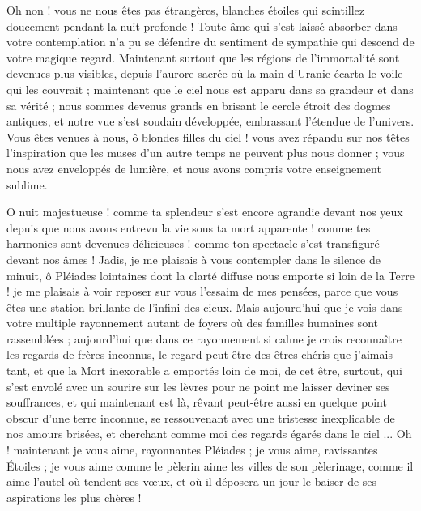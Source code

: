 \documentclass[a4paper, 11pt, oneside, landscape]{article}
\begin{document}
Oh non ! vous ne nous êtes pas étrangères, blanches étoiles qui scintillez doucement pendant la nuit profonde ! Toute âme qui s'est laissé absorber dans votre contemplation n'a pu se défendre du sentiment de sympathie qui descend de votre magique regard. Maintenant surtout que les régions de l'immortalité sont devenues plus visibles, depuis l'aurore sacrée où la main d'Uranie écarta le voile qui les couvrait ; maintenant que le ciel nous est apparu dans sa grandeur et dans sa vérité ; nous sommes devenus grands en brisant le cercle étroit des dogmes antiques, et notre vue s'est soudain développée, embrassant l'étendue de l'univers. Vous êtes venues à nous, ô blondes filles du ciel ! vous avez répandu sur nos têtes l'inspiration que les muses d'un autre temps ne peuvent plus nous donner ; vous nous avez enveloppés de lumière, et nous avons compris votre enseignement sublime.

O nuit majestueuse ! comme ta splendeur s'est encore agrandie devant nos yeux depuis que nous avons entrevu la vie sous ta mort apparente ! comme tes harmonies sont devenues délicieuses ! comme ton spectacle s'est transfiguré devant nos âmes ! Jadis, je me plaisais à vous contempler dans le silence de minuit, ô Pléiades lointaines dont la clarté diffuse nous emporte si loin de la Terre ! je me plaisais à voir reposer sur vous l'essaim de mes pensées, parce que vous êtes une station brillante de l'infini des cieux. Mais aujourd'hui que je vois dans votre multiple rayonnement autant de foyers où des familles humaines sont rassemblées ; aujourd'hui que dans ce rayonnement si calme je crois reconnaître les regards de frères inconnus, le regard peut-être des êtres chéris que j'aimais tant, et que la Mort inexorable a emportés loin de moi, de cet être, surtout, qui s'est envolé avec un sourire sur les lèvres pour ne point me laisser deviner ses souffrances, et qui maintenant est là, rêvant peut-être aussi en quelque point obscur d'une terre inconnue, se ressouvenant avec une tristesse inexplicable de nos amours brisées, et cherchant comme moi des regards égarés dans le ciel ... Oh ! maintenant je vous aime, rayonnantes Pléiades ; je vous aime, ravissantes Étoiles ; je vous aime comme le pèlerin aime les villes de son pèlerinage, comme il aime l'autel où tendent ses vœux, et où il déposera un jour le baiser de ses aspirations les plus chères !
\end{document}
